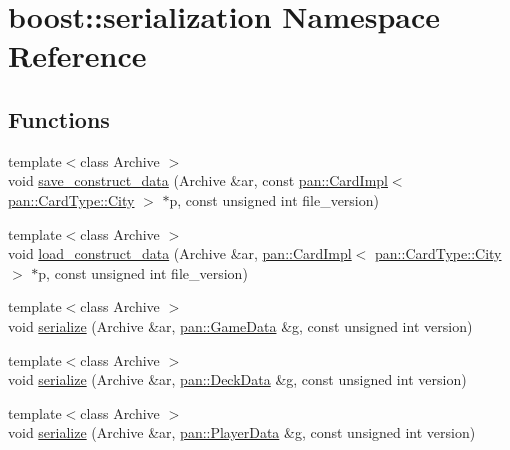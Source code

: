 \hypertarget{namespaceboost_1_1serialization}{}\section{boost\+:\+:serialization Namespace Reference}
\label{namespaceboost_1_1serialization}
\subsection*{Functions}
\begin{DoxyCompactItemize}
\item 
{\footnotesize template$<$class Archive $>$ }\\void \hyperlink{namespaceboost_1_1serialization_a4f15bc5acd6efbe9db67f1272d8f639b}{save\+\_\+construct\+\_\+data} (Archive \&ar, const \hyperlink{classpan_1_1_card_impl}{pan\+::\+Card\+Impl}$<$ \hyperlink{namespacepan_a1f7350bfd0421afeabe9fa95c16fa811a57d056ed0984166336b7879c2af3657f}{pan\+::\+Card\+Type\+::\+City} $>$ $\ast$p, const unsigned int file\+\_\+version)
\item 
{\footnotesize template$<$class Archive $>$ }\\void \hyperlink{namespaceboost_1_1serialization_ae9c831b8f31fae23f351ac8fb5ce6bae}{load\+\_\+construct\+\_\+data} (Archive \&ar, \hyperlink{classpan_1_1_card_impl}{pan\+::\+Card\+Impl}$<$ \hyperlink{namespacepan_a1f7350bfd0421afeabe9fa95c16fa811a57d056ed0984166336b7879c2af3657f}{pan\+::\+Card\+Type\+::\+City} $>$ $\ast$p, const unsigned int file\+\_\+version)
\item 
{\footnotesize template$<$class Archive $>$ }\\void \hyperlink{namespaceboost_1_1serialization_a61458ca4ff4153850af0c3adb4a322e5}{serialize} (Archive \&ar, \hyperlink{structpan_1_1_game_data}{pan\+::\+Game\+Data} \&g, const unsigned int version)
\item 
{\footnotesize template$<$class Archive $>$ }\\void \hyperlink{namespaceboost_1_1serialization_abdc673b3465f1623bbcb5147b157d017}{serialize} (Archive \&ar, \hyperlink{structpan_1_1_deck_data}{pan\+::\+Deck\+Data} \&g, const unsigned int version)
\item 
{\footnotesize template$<$class Archive $>$ }\\void \hyperlink{namespaceboost_1_1serialization_af7995dd0297acbf25eed2a5de6f7b1ba}{serialize} (Archive \&ar, \hyperlink{structpan_1_1_player_data}{pan\+::\+Player\+Data} \&g, const unsigned int version)

\end{DoxyCompactItemize}
